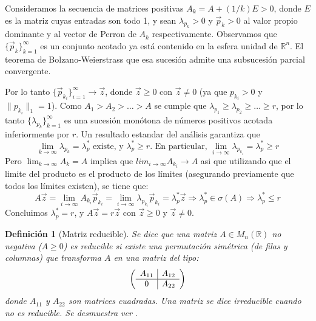\documentclass[size=a4, parskip=half, titlepage=false, toc=flat, toc=bib, 12pt, twoside]{scrartcl}
\makeatletter
\renewenvironment{proof}[1][\proofname] {\par\pushQED{\qed}\normalfont\topsep6\p@\@plus6\p@\relax\trivlist\item[\hskip\labelsep\itshape\tgpaella#1\@addpunct{.}]\ignorespaces}{\popQED\endtrivlist\@endpefalse}
\theoremstyle{theorem-style}
\theoremstyle{definition-style}
\newtheorem{ndef}{Definición}[section]
\theoremstyle{remark-style}
\theoremstyle{example-style}
\theoremstyle{definition-style}
\theoremstyle{remark-style}
\renewcommand{\proofname}{\normalfont\tgpaella\bfseries\small DEMOSTRACIÓN}
\makeatother
\begin{document}
\begin{proof}
Consideramos la secuencia de matrices positivas $A_k = A + (1/k)E > 0$, donde $E$ es la matriz cuyas entradas son todo 1, y sean $\lambda_{p_k} >0$ y $\vec{p}_k >0$ al valor propio dominante y al vector de Perron de $A_k$ respectivamente. Observamos que $\{\vec{p}_k\}_{k=1}^{\infty}$ es un conjunto acotado ya está contenido en la esfera unidad de $\mathbb{R}^n$. El teorema de Bolzano-Weierstrass que esa sucesión admite una subsucesión parcial convergente.

Por lo tanto $\{\vec{p}_{k_i}\}_{i = 1}^{\infty} \rightarrow \vec{z}$, donde $\vec{z} \geq 0$ con $\vec{z} \neq 0$ (ya que $p_{k_i} > 0$ y $\|p_{k_i} \|_1 = 1$). Como $A_1 > A_2 > \dots > A$ se cumple que $\lambda_{p_1} \geq \lambda_{p_2} \geq \dots \geq r $, por lo tanto $\{\lambda_{p_k}\}_{k = 1}^{\infty}$ es una sucesión monótona de números positivos acotada inferiormente por $r$. Un resultado estandar del análisis garantiza que
$$\lim_{k \to \infty} \lambda_{p_k} = \lambda_p^* \textrm{ existe, y } \lambda_p^* \geq r \textrm{. En particular, } \lim_{i \to \infty} \lambda_{p_{k_i}} = \lambda_p^* \geq r$$
Pero $\lim_{k \to \infty} A_k = A$ implica que $lim_{i \to \infty} A_{k_i} \rightarrow A$ asi que utilizando que el limite del producto es el producto de los límites (asegurando previamente que todos los límites existen), se tiene que:
$$A \vec{z} = \lim_{i \to \infty} A_{k_i} \vec{p}_k_i = \lim_{i \to \infty} \lambda_{p_{k_i}} \vec{p}_{k_i} = \lambda_p^* \vec{z}  \Rightarrow \lambda_p^* \in \sigma(A) \Rightarrow \lambda_p^* \leq r$$
Concluimos $\lambda_p^* = r$, y $A \vec{z} = r \vec{z}$ con $\vec{z} \geq 0$ y $\vec{z} \neq 0$.
\end{proof}

\begin{ndef}[Matriz reducible]
Se dice que una matriz $A \in M_n(\mathbb{R})$ no negativa ($A \geq 0$) es reducible si existe una permutación simétrica (de filas y columnas) que transforma $A$ en una matriz del tipo:
$$\left(
      \begin{array}{{c|c}}
            A_{11}    &    A_{12}  \\\hline
            0         &    A_{22}     \\
      \end{array}   \right)$$
donde $A_{11}$ y $A_{22}$ son matrices cuadradas. Una matriz se dice irreducible cuando no es reducible. Se desmuestra ver \cite{algebralineal}.
\end{ndef}
\end{document}
